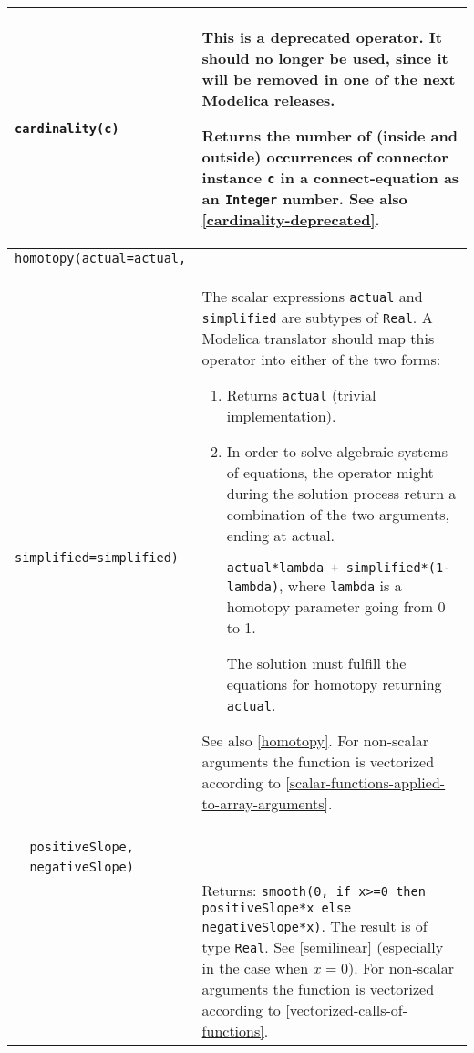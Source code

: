 \begin{longtable}{|p{5.1cm}|p{8cm}|}
\lstinline!cardinality(c)! &
\begin{nonnormative*}
This is a deprecated operator. It should no longer be used, since it will be removed in one of the next Modelica releases.
\end{nonnormative*}

Returns the number of (inside and outside) occurrences of connector
instance \lstinline!c! in a connect-equation as an \lstinline!Integer! number. See also \cref{cardinality-deprecated}.\\
\hline

\lstinline!homotopy(actual=actual,!\\
\lstinline!   simplified=simplified)! & The scalar expressions \lstinline!actual! and \lstinline!simplified! are subtypes of
\lstinline!Real!. A Modelica translator should map this operator into either of the two forms:
\begin{enumerate}
\item
  Returns \lstinline!actual! (trivial implementation).
\item
  In order to solve algebraic systems of equations, the operator might
  during the solution process return a combination of the two arguments,
  ending at actual.
  \begin{example}
  \lstinline!actual*lambda + simplified*(1-lambda)!, where \lstinline!lambda! is a homotopy parameter going from 0 to 1.
  \end{example}
  The solution must fulfill the equations for homotopy returning \lstinline!actual!.
\end{enumerate}

See also \cref{homotopy}. For non-scalar arguments the function is
vectorized according to \cref{scalar-functions-applied-to-array-arguments}.\\
\hline

\begin{tabular}{@{}p{5.1cm}@{}}
\lstinline!semiLinear(x,!\\
\lstinline!  positiveSlope,!\\
\lstinline!  negativeSlope)!\\
\end{tabular}&
Returns:
\lstinline!smooth(0, if x>=0 then positiveSlope*x else negativeSlope*x)!.
The result is of type \lstinline!Real!. See \cref{semilinear} (especially in
the case when $x = 0$). For non-scalar arguments the function is
vectorized according to \cref{vectorized-calls-of-functions}.\\
\hline


\end{longtable}
